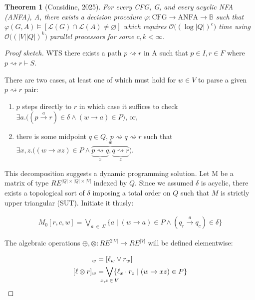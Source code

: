 \documentclass[11pt]{article}
\theoremstyle{plain}
\newtheorem{theorem}{Theorem}
\theoremstyle{definition}
\begin{document}
\begin{theorem}[Considine, 2025]
  For every CFG, G, and every acyclic NFA (ANFA), A, there exists a decision procedure $\varphi: \text{CFG} \rightarrow \text{ANFA} \rightarrow \mathbb{B}$ such that $\varphi(G, A) \models [\mathcal{L}(G)\cap\mathcal{L}(A) \neq \varnothing]$ which requires $\mathcal{O}\big((\log |Q|)^c\big)$ time using $\mathcal{O}\big((|V||Q|)^k\big)$ parallel processors for some $c, k < \infty$.
\end{theorem}

\begin{proof}[Proof sketch]
  WTS there exists a path $p \rightsquigarrow r$ in A such that $p\in I, r\in F$ where $p \rightsquigarrow r \vdash S$.\vspace{0.3cm}

  \noindent There are two cases, at least one of which must hold for $w \in V$ to parse a given $p \rightsquigarrow r$ pair:

  \begin{enumerate}
    \item $p$ steps directly to $r$ in which case it suffices to check $\exists a.\big((p \overset{a}{\rightarrow} r)\in \delta \land (w \rightarrow a) \in P\big)$, or,
    \item there is some midpoint $q \in Q$, $p \rightsquigarrow q \rightsquigarrow r$ such that $\exists x, z.\big((w \rightarrow xz) \in P\land\overbrace{\underbrace{p \rightsquigarrow q}_x, \underbrace{q \rightsquigarrow r}_z}^w\big)$.
  \end{enumerate}

\noindent This decomposition suggests a dynamic programming solution. Let M be a matrix of type $RE^{|Q|\times|Q|\times|V|}$  indexed by $Q$. Since we assumed $\delta$ is acyclic, there exists a topological sort of $\delta$ imposing a total order on $Q$ such that $M$ is strictly upper triangular (SUT). Initiate it thusly:

\begin{align}
    M_0[r, c, w] = \bigvee_{a\:\in\:\Sigma} \{a \mid (w \rightarrow a) \in P \land (q_r \overset{a}{\rightarrow} q_c)\in \delta\}
\end{align}

\noindent The algebraic operations $\oplus, \otimes: RE^{2|V|} \rightarrow RE^{|V|}$ will be defined elementwise:

\begin{align}
  [\ell \oplus r]_w  &= [\ell_w \lor r_w]\\
  [\ell \otimes r]_w &= \bigvee_{\mathclap{x, z\:\in\:V}}\{\ell_x \cdot r_z \mid (w \rightarrow xz) \in P\}
\end{align}


\end{proof}
\end{document}
